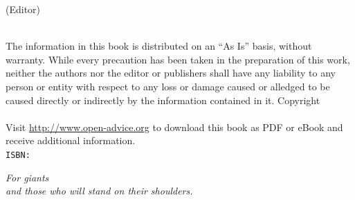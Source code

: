 \thispagestyle{empty}
\booktitle
\newpage
\newpage
\begin{titlepage}
\begin{flushright}
\bookeditor{} (Editor)\\
\vspace{10em}
{\Huge\bfseries\sffamily\booktitle}\\
\vspace{2em}
{\large\sffamily\booksubtitle}
\end{flushright}
\end{titlepage}
\thispagestyle{empty}
The information in this book is distributed on an ``As Is'' basis, without warranty. While every precaution has been taken in the preparation of this work, neither the authors nor the editor or publishers shall have any liability to any person or entity with respect to any loss or damage caused or alledged to be caused directly or indirectly by the information contained in it.%
\vfill
Copyright \textcopyright{} \bookyear{} \bookauthors\\
\newline
{}
\newline \\
Visit \url{http://www.open-advice.org} to download this book as PDF or eBook and receive additional information.
\newline \\
{\tt ISBN: \bookisbn}%
\newpage
\thispagestyle{empty}
\vspace*{2cm}
\begin{flushright}
{\Large\itshape For giants\\and those who will stand on their shoulders.}\\
\end{flushright}
\newpage
\thispagestyle{empty}
\mbox{}
\newpage

